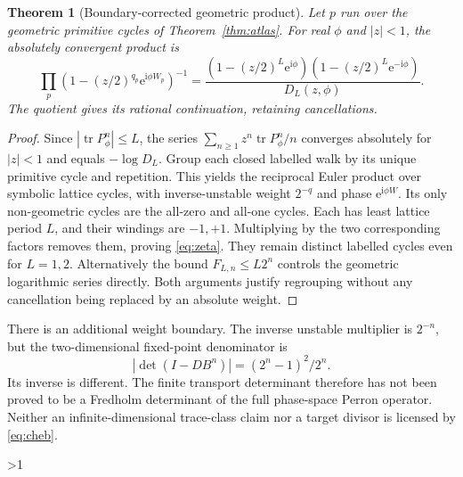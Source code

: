 \documentclass[10pt]{article}
\newtheorem{theorem}{Theorem}
\newcommand{\ii}{\mathrm i}
\newcommand{\ee}{\mathrm e}
\newcommand{\tr}{\operatorname{tr}}
\begin{document}
\begin{theorem}[Boundary-corrected geometric product]\label{thm:zeta}
Let $p$ run over the geometric primitive cycles of Theorem~\ref{thm:atlas}.
For real $\phi$ and $|z|<1$, the absolutely convergent product is
\begin{equation}\label{eq:zeta}
\prod_p\left(1-(z/2)^{q_p}\ee^{\ii\phi W_p}\right)^{-1}
=\frac{(1-(z/2)^L\ee^{\ii\phi})(1-(z/2)^L\ee^{-\ii\phi})}
{D_L(z,\phi)}.
\end{equation}
The quotient gives its rational continuation, retaining cancellations.
\end{theorem}
\begin{proof}
Since $|\tr P_\phi^n|\leq L$, the series
$\sum_{n\geq1}z^n\tr P_\phi^n/n$ converges absolutely for $|z|<1$ and equals
$-\log D_L$. Group each closed labelled walk by its unique primitive cycle
and repetition. This yields the reciprocal Euler product over symbolic
lattice cycles, with inverse-unstable weight $2^{-q}$ and phase
$\ee^{\ii\phi W}$. Its only non-geometric cycles are the all-zero and all-one
cycles. Each has least lattice period $L$, and their windings are $-1,+1$.
Multiplying by the two corresponding factors removes them, proving
\eqref{eq:zeta}. They remain distinct labelled cycles even for $L=1,2$.
Alternatively the bound $F_{L,n}\leq L2^n$ controls the geometric logarithmic
series directly. Both arguments justify regrouping without any cancellation
being replaced by an absolute weight.
\end{proof}

There is an additional weight boundary. The inverse unstable multiplier is
$2^{-n}$, but the two-dimensional fixed-point denominator is
\begin{equation}\label{eq:flat}
|\det(I-DB^n)|=(2^n-1)^2/2^n.
\end{equation}
Its inverse is different. The finite transport determinant therefore has not
been proved to be a Fredholm determinant of the full phase-space Perron
operator. Neither an infinite-dimensional trace-class claim nor a target
divisor is licensed by \eqref{eq:cheb}.
\fi

\ifnum\CRevisionRound>1
\end{document}
